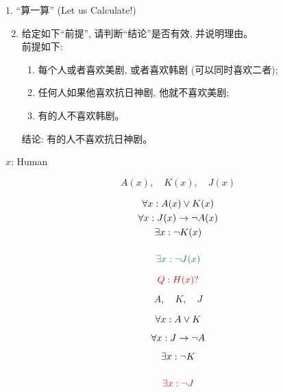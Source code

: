 \begin{frame}{}
  \begin{exampleblock}{$1.$ ``算一算'' (Let us Calculate!)}	
    \begin{enumerate}[(1)]
      \setcounter{enumi}{1}
      \item 给定如下``前提'', 请判断``结论''是否有效, 并说明理由。\\
	前提如下:

	\begin{enumerate}[(1)]
	  \item 每个人或者喜欢美剧, 或者喜欢韩剧 (可以同时喜欢二者);
	  \item 任何人如果他喜欢抗日神剧, 他就不喜欢美剧;
	  \item 有的人不喜欢韩剧。
	\end{enumerate}
	结论: 有的人不喜欢抗日神剧。
    \end{enumerate}
  \end{exampleblock}
\end{frame}

\begin{frame}{}
  \centerline{$x$: Human}

  \[
    A(x),\quad K(x),\quad J(x)
  \]

  \pause
  \setlength{\jot}{1.5ex}
  \begin{gather}
    \setcounter{equation}{0}
    \forall x: A(x) \lor K(x) \\
    \forall x: J(x) \to \lnot A(x) \\
    \exists x: \lnot K(x) \\[3ex]
    \teal{\exists x: \lnot J(x)}
  \end{gather}

  \pause
  \[
    \textcolor{red}{Q: H(x)?}
  \]
\end{frame}

\begin{frame}{}
  \[
    A,\quad K,\quad J
  \]

  \begin{gather}
    \setcounter{equation}{0}
    \forall x: A \lor K \\[1ex]
    \forall x: J \to \lnot A \\[1ex]
    \exists x: \lnot K \\[3ex]
    \red{\exists x: \lnot J}
  \end{gather}
\end{frame}
